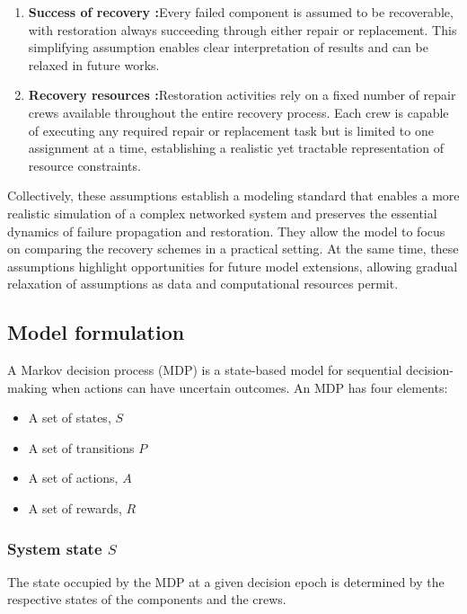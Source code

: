 \documentclass[conference]{IEEEtran}
\begin{document}
\begin{enumerate}
    \item \textbf{Success of recovery :}Every failed component is assumed to be recoverable, with restoration always succeeding through either repair or replacement. This simplifying assumption enables clear interpretation of results and can be relaxed in future works.

    \item  \textbf{Recovery resources :}Restoration activities rely on a fixed number of repair crews available throughout the entire recovery process. Each crew is capable of executing any required repair or replacement task but is limited to one assignment at a time, establishing a realistic yet tractable representation of resource constraints.

\end{enumerate}

Collectively, these assumptions establish a modeling standard that enables a more realistic simulation of a complex networked system and preserves the essential dynamics of failure propagation and restoration. They allow the model to focus on comparing the recovery schemes in a practical setting. At the same time, these assumptions highlight opportunities for future model extensions, %
allowing gradual relaxation of assumptions as data and computational resources permit.

\subsection{Model formulation}
A Markov decision process (MDP) is a state-based model for sequential decision-making when actions can have uncertain outcomes. An MDP has four elements:
\begin{itemize}
    \item A set of states, $S$
    \item A set of transitions $P$
    \item A set of actions, $A$
    \item A set of rewards, $R$
\end{itemize}

\subsubsection{System state \texorpdfstring{$S$}{S}}
The state occupied by the MDP at a given decision epoch is determined by the respective states of the components and the crews.
\end{document}
